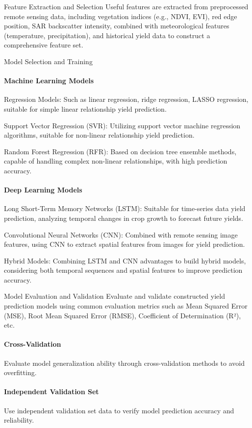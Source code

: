 Feature Extraction and Selection
Useful features are extracted from preprocessed remote sensing data, including vegetation indices (e.g., NDVI, EVI), red edge position, SAR backscatter intensity, combined with meteorological features (temperature, precipitation), and historical yield data to construct a comprehensive feature set.

Model Selection and Training
\paragraph*{Machine Learning Models}
Regression Models: Such as linear regression, ridge regression, LASSO regression, suitable for simple linear relationship yield prediction.

Support Vector Regression (SVR): Utilizing support vector machine regression algorithms, suitable for non-linear relationship yield prediction.

Random Forest Regression (RFR): Based on decision tree ensemble methods, capable of handling complex non-linear relationships, with high prediction accuracy.

\paragraph*{Deep Learning Models}
Long Short-Term Memory Networks (LSTM): Suitable for time-series data yield prediction, analyzing temporal changes in crop growth to forecast future yields.

Convolutional Neural Networks (CNN): Combined with remote sensing image features, using CNN to extract spatial features from images for yield prediction.

Hybrid Models: Combining LSTM and CNN advantages to build hybrid models, considering both temporal sequences and spatial features to improve prediction accuracy.

Model Evaluation and Validation
Evaluate and validate constructed yield prediction models using common evaluation metrics such as Mean Squared Error (MSE), Root Mean Squared Error (RMSE), Coefficient of Determination (R²), etc.

\paragraph*{Cross-Validation} Evaluate model generalization ability through cross-validation methods to avoid overfitting.

\paragraph*{Independent Validation Set} Use independent validation set data to verify model prediction accuracy and reliability.

